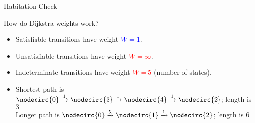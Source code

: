 

\begin{frame}{Habitation Check}

  How do Dijkstra weights work?

  \only<2,3>{\scalebox{0.8}{}}%

  \begin{itemize}
  \item<2->{Satisfiable transitions have weight \textcolor{blue}{$W\!=1$}.}
  \item<3->{Unsatisfiable transitions have weight \textcolor{red}{$W\!=\infty$}.}
  \item<4->{Indeterminate transitions have weight \textcolor{red}{$W\!=5$} (number of states).}
  \item<5>{Shortest path is $\nodecirc{0} \xrightarrow{1} \nodecirc{3} \xrightarrow{1} \nodecirc{4}  \xrightarrow{1} \nodecirc{2}$; length is $3$\\
  Longer path is $\nodecirc{0}\xrightarrow{5}\nodecirc{1}\xrightarrow{1}\nodecirc{2}$; length is $6$}
  \end{itemize}
\end{frame}




